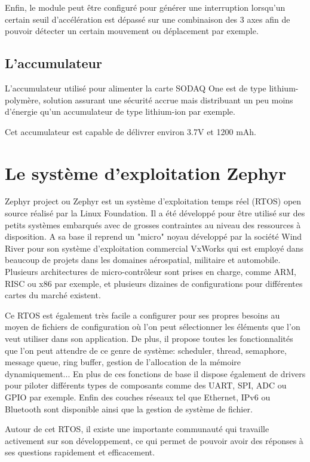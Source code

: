 Enfin, le module peut être configuré pour générer une interruption lorsqu'un certain seuil d'accélération est dépassé sur une combinaison des 3 axes afin de pouvoir détecter un certain mouvement ou déplacement par exemple. 

\subsection{L'accumulateur}

L'accumulateur utilisé pour alimenter la carte SODAQ One est de type lithium-polymère, solution assurant une sécurité accrue mais distribuant un peu moins d'énergie qu'un accumulateur de type lithium-ion par exemple.

Cet accumulateur est capable de délivrer environ 3.7V et 1200 mAh.

\section{Le système d'exploitation Zephyr}

Zephyr project ou Zephyr est un système d'exploitation temps réel (RTOS) open source réalisé par la Linux Foundation. Il a été développé pour être utilisé sur des petits systèmes embarqués avec de grosses contraintes au niveau des ressources à disposition. A sa base il reprend un "micro" noyau développé par la société Wind River pour son système d'exploitation commercial VxWorks qui est employé dans beaucoup de projets dans les domaines aérospatial, militaire et automobile.
Plusieurs architectures de micro-contrôleur sont prises en charge, comme ARM, RISC ou x86 par exemple, et plusieurs dizaines de configurations pour différentes cartes du marché existent. 

Ce RTOS est également très facile a configurer pour ses propres besoins au moyen de fichiers de configuration où l'on peut sélectionner les éléments que l'on veut utiliser dans son application. De plus, il propose toutes les fonctionnalités que l'on peut attendre de ce genre de système: scheduler, thread, semaphore, message queue, ring buffer, gestion de l'allocation de la mémoire dynamiquement...
En plus de ces fonctions de base il dispose également de drivers pour piloter différents types de composants comme des UART, SPI, ADC ou GPIO par exemple. Enfin des couches réseaux tel que Ethernet, IPv6 ou Bluetooth sont disponible ainsi que la gestion de système de fichier. \cite{zephyr_web}

Autour de cet RTOS, il existe une importante communauté qui travaille activement sur son développement, ce qui permet de pouvoir avoir des réponses à ses questions rapidement et efficacement.

